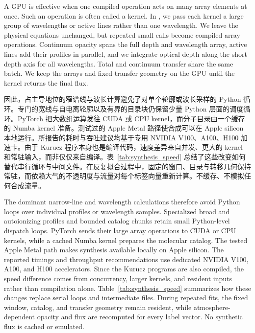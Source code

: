 \begin{EN}
A GPU is effective when one compiled operation acts on many array
elements at once. Such an operation is often called a kernel. In \paynezero,
we pass each kernel a large group of wavelengths or active lines rather than
one wavelength. We leave the physical equations unchanged, but repeated
small calls become compiled array operations. Continuum opacity spans the full
depth and wavelength array, active lines add their profiles in parallel, and
we integrate optical depth along the short depth axis for all wavelengths.
Total and continuum transfer share the same batch. We keep the arrays and fixed
transfer geometry on the GPU until the kernel returns the final flux.
\end{EN}

因此，占主导地位的窄谱线与波长计算避免了对单个轮廓或波长采样的 Python 循环。专门的宽线与自电离轮廓以及有界的目录块仍保留少量 Python 层面的调度循环。PyTorch 把大数组运算发往 CUDA 或 CPU kernel，而分子目录由一个缓存的 Numba kernel 准备。测试过的 Apple Metal 路径使合成可以在 Apple silicon 本地运行。所报告的耗时与吞吐建议均基于专用 NVIDIA V100、A100、H100 加速卡。由于 Kurucz 程序本身也是编译代码，速度差异来自并发、更大的 kernel 和常驻输入，而非仅仅来自编译。表~\ref{tab:synthesis_speed} 总结了这些改变如何替代串行循环与中间文件。在反复拟合过程中，固定的窗口、目录与转移几何保持常驻，而依赖大气的不透明度与流量对每个标签向量重新计算。不缓存、不模拟任何合成流量。

\begin{EN}
The dominant narrow-line and wavelength calculations therefore avoid Python
loops over individual profiles or wavelength samples. Specialized broad and
autoionizing profiles and bounded catalog chunks retain small Python-level
dispatch loops. PyTorch sends their large array operations to CUDA or CPU
kernels, while a cached Numba kernel prepares the molecular catalog. The tested Apple Metal path makes synthesis available
locally on Apple silicon. The reported timings and throughput
recommendations use dedicated NVIDIA V100, A100, and H100 accelerators. Since the
Kurucz programs are also compiled, the speed difference comes from concurrency,
larger kernels, and resident inputs rather than compilation alone.
Table~\ref{tab:synthesis_speed} summarizes how these changes replace serial
loops and intermediate files. During repeated fits, the fixed window, catalog,
and transfer geometry remain resident, while atmosphere-dependent opacity and
flux are recomputed for every label vector. No synthetic flux is cached or
emulated.
\end{EN}

